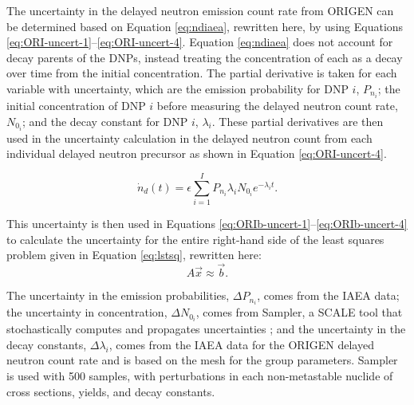 \documentclass{style/nseJournal}
\begin{document}
The uncertainty in the delayed neutron emission count rate from ORIGEN can be determined based on Equation \eqref{eq:ndiaea}, rewritten here, by using Equations \eqref{eq:ORI-uncert-1}--\eqref{eq:ORI-uncert-4}.
Equation \eqref{eq:ndiaea} does not account for decay parents of the DNPs, instead treating the concentration of each as a decay over time from the initial concentration.
The partial derivative is taken for each variable with uncertainty, which are the emission probability for DNP $i$, $P_{n_i}$; the initial concentration of DNP $i$ before measuring the delayed neutron count rate, $N_{0_i}$; and the decay constant for DNP $i$, $\lambda_i$. 
These partial derivatives are then used in the uncertainty calculation in the delayed neutron count from each individual delayed neutron precursor as shown in Equation \eqref{eq:ORI-uncert-4}.

\begin{equation}
\dot{n}_d(t) = \epsilon \sum_{i=1}^{I} P_{n_i} \lambda_i N_{0_i} e^{-\lambda_i t}.
\nonumber
\end{equation}

This uncertainty is then used in Equations \eqref{eq:ORIb-uncert-1}--\eqref{eq:ORIb-uncert-4} to calculate the uncertainty for the entire right-hand side of the least squares problem given in Equation \eqref{eq:lstsq}, rewritten here:
\begin{equation}
A \vec{x} \approx \vec{b}.
\nonumber
\end{equation}

The uncertainty in the emission probabilities, $\Delta P_{n_i}$, comes from the IAEA data; the uncertainty in concentration, $\Delta N_{0_i}$, comes from Sampler, a SCALE tool that stochastically computes and propagates uncertainties \cite{wieselquist_scale_2023}; and the uncertainty in the decay constants, $\Delta \lambda_{i}$, comes from the IAEA data for the ORIGEN delayed neutron count rate and is based on the mesh for the group parameters. Sampler is used with 500 samples, with perturbations in each non-metastable nuclide of cross sections, yields, and decay constants.


\end{document}
